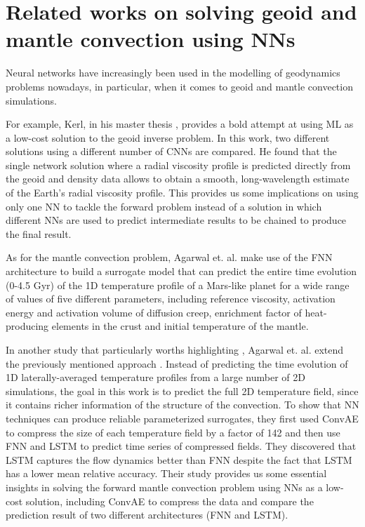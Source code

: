 \section{Related works on solving geoid and mantle convection using NNs}

Neural networks have increasingly been used in the modelling of geodynamics problems nowadays, in particular, when it comes to geoid and mantle convection simulations. 

For example, Kerl, in his master thesis \citep{kerl2022geoid}, provides a bold attempt at using ML as a low-cost solution to the geoid inverse problem. In this work, two different solutions using a different number of CNNs are compared. He found that the single network solution where a radial viscosity profile is predicted directly from the geoid and density data allows to obtain a smooth, long-wavelength estimate of the Earth's radial viscosity profile. This provides us some implications on using only one NN to tackle the forward problem instead of a solution in which different NNs are used to predict intermediate results to be chained to produce the final result.

As for the mantle convection problem, Agarwal et. al. \citep{10.1093_gji_ggaa234} make use of the FNN architecture to build a surrogate model that can predict the entire time evolution (0-4.5 Gyr) of the 1D temperature profile of a Mars-like planet for a wide range of values of five different parameters, including reference viscosity, activation energy and activation volume of diffusion creep, enrichment factor of heat-producing elements in the crust and initial temperature of the mantle.

In another study that particularly worths highlighting \citep{10.1103_physrevfluids.6.113801}, Agarwal et. al. extend the previously mentioned approach \citep{10.1093_gji_ggaa234}. Instead of predicting the time evolution of 1D laterally-averaged temperature profiles from a large number of 2D simulations, the goal in this work is to predict the full 2D temperature field, since it contains richer information of the structure of the convection.\citep{10.1103_physrevfluids.6.113801} To show that NN techniques can produce reliable parameterized surrogates, they first used ConvAE to compress the size of each temperature field by a factor of 142 and then use FNN and LSTM to predict time series of compressed fields. They discovered that LSTM captures the flow dynamics better than FNN despite the fact that LSTM has a lower mean relative accuracy. Their study provides us some essential insights in solving the forward mantle convection problem using NNs as a low-cost solution, including ConvAE to compress the data and compare the prediction result of two different architectures (FNN and LSTM).

